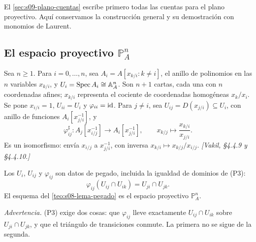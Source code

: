 El \cref{sec:s09-plano-cuentas} escribe primero todas las cuentas para el plano proyectivo. Aquí conservamos la construcción general y su demostración con monomios de Laurent.

\subsection{El espacio proyectivo \texorpdfstring{$\mathbb P^n_A$}{PnA}}

\begin{defi}
\label{defi:s08-cartas-proyectiva-n}
Sea $n\geq1$. Para $i=0,\ldots,n$, sea $A_i=A[x_{k/i}:k\ne i]$, el anillo de polinomios en las $n$ variables $x_{k/i}$, y $U_i=\operatorname{Spec} A_i\cong\mathbb A_A^n$. Son $n+1$ cartas, cada una con $n$ coordenadas afines; $x_{k/i}$ representa el cociente de coordenadas homogéneas $x_k/x_i$. Se pone $x_{i/i}=1$, $U_{ii}=U_i$ y $\varphi_{ii}=\operatorname{id}$. Para $j\ne i$, sea $U_{ij}=D(x_{j/i})\subseteq U_i$, con anillo de funciones $A_i[x_{j/i}^{-1}]$, y
\[
\varphi_{ij}^\sharp\colon A_j[x_{i/j}^{-1}]\longrightarrow A_i[x_{j/i}^{-1}],
\qquad x_{k/j}\longmapsto\frac{x_{k/i}}{x_{j/i}}.
\]
Es un isomorfismo: envía $x_{i/j}$ a $x_{j/i}^{-1}$, con inversa $x_{k/i}\mapsto x_{k/j}/x_{i/j}$. \emph{[Vakil, \S4.4.9 y \S4.4.10.]}
\end{defi}

\begin{prop}
\label{prop:s08-cociclo-proyectiva-n}
Los $U_i$, $U_{ij}$ y $\varphi_{ij}$ son datos de pegado, incluida la igualdad de dominios de (P3):
\[
\varphi_{ij}(U_{ij}\cap U_{ik})=U_{ji}\cap U_{jk}.
\]
El esquema del \cref{teo:s08-lema-pegado} es el espacio proyectivo $\mathbb P_A^n$.
\end{prop}

\emph{Advertencia.} (P3) exige dos cosas: que $\varphi_{ij}$ lleve exactamente $U_{ij}\cap U_{ik}$ sobre $U_{ji}\cap U_{jk}$, y que el triángulo de transiciones conmute. La primera no se sigue de la segunda.

